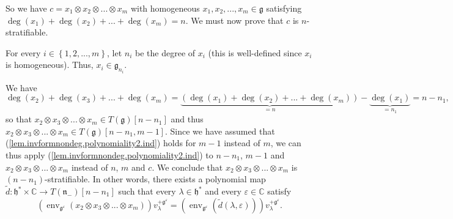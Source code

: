 \documentclass[etingof-lie.tex]{subfiles}
\begin{document}
So we have $c=x_{1}\otimes x_{2}\otimes...\otimes x_{m}$ with homogeneous
$x_{1},x_{2},...,x_{m}\in\mathfrak{g}$ satisfying $\deg\left(  x_{1}\right)
+\deg\left(  x_{2}\right)  +...+\deg\left(  x_{m}\right)  =n$. We must now
prove that $c$ is $n$-stratifiable.

For every $i\in\left\{  1,2,...,m\right\}  $, let $n_{i}$ be the degree of
$x_{i}$ (this is well-defined since $x_{i}$ is homogeneous). Thus, $x_{i}%
\in\mathfrak{g}_{n_{i}}$.

We have%
\[
\deg\left(  x_{2}\right)  +\deg\left(  x_{3}\right)  +...+\deg\left(
x_{m}\right)  =\underbrace{\left(  \deg\left(  x_{1}\right)  +\deg\left(
x_{2}\right)  +...+\deg\left(  x_{m}\right)  \right)  }_{=n}-\underbrace{\deg
\left(  x_{1}\right)  }_{=n_{1}}=n-n_{1},
\]
so that $x_{2}\otimes x_{3}\otimes...\otimes x_{m}\in T\left(  \mathfrak{g}%
\right)  \left[  n-n_{1}\right]  $ and thus $x_{2}\otimes x_{3}\otimes
...\otimes x_{m}\in T\left(  \mathfrak{g}\right)  \left[  n-n_{1},m-1\right]
$. Since we have assumed that (\ref{lem.invformnondeg.polynomiality2.ind})
holds for $m-1$ instead of $m$, we can thus apply
(\ref{lem.invformnondeg.polynomiality2.ind}) to $n-n_{1}$, $m-1$ and
$x_{2}\otimes x_{3}\otimes...\otimes x_{m}$ instead of $n$, $m$ and $c$. We
conclude that $x_{2}\otimes x_{3}\otimes...\otimes x_{m}$ is $\left(
n-n_{1}\right)  $-stratifiable. In other words, there exists a polynomial map
$\widetilde{d}:\mathfrak{h}^{\ast}\times\mathbb{C}\rightarrow T\left(
\mathfrak{n}_{-}\right)  \left[  n-n_{1}\right]  $ such that every $\lambda
\in\mathfrak{h}^{\ast}$ and every $\varepsilon\in\mathbb{C}$ satisfy%
\[
\left(  \operatorname*{env}\nolimits_{\mathfrak{g}^{\varepsilon}}\left(
x_{2}\otimes x_{3}\otimes...\otimes x_{m}\right)  \right)  v_{\lambda
}^{+\mathfrak{g}^{\varepsilon}}=\left(  \operatorname*{env}%
\nolimits_{\mathfrak{g}^{\varepsilon}}\left(  \widetilde{d}\left(
\lambda,\varepsilon\right)  \right)  \right)  v_{\lambda}^{+\mathfrak{g}%
^{\varepsilon}}.
\]
\end{document}
